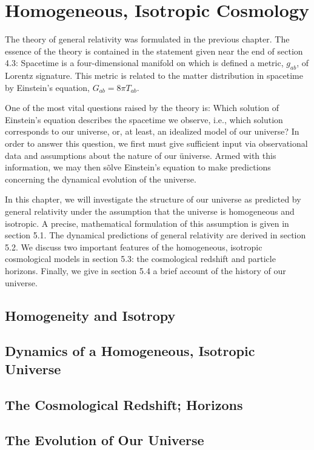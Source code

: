 \chapter{Homogeneous, Isotropic Cosmology}
The theory of general relativity was formulated in the previous chapter. The essence of the theory is contained in the statement given near the end of section 4.3: Spacetime is a four-dimensional manifold on which is defined a metric, $g_{ab}$, of Lorentz signature. This metric is related to the matter distribution in spacetime by Einstein's equation, $G_{ab}=8\pi T_{ab}.$

One of the most vital questions raised by the theory is: Which solution of Einstein's equation describes the spacetime we observe, i.e., which solution corresponds to our universe, or, at least, an idealized model of our universe? In order to answer this question, we first must give sufficient input via observational data and assumptions about the nature of our üniverse. Armed with this information, we may then sõlve Einstein's equation to make predictions concerning the dynamical evolution of the universe.

In this chapter, we will investigate the structure of our universe as predicted by general relativity under the assumption that the universe is homogeneous and isotropic. A precise, mathematical formulation of this assumption is given in section 5.1. The dynamical predictions of general relativity are derived in section 5.2. We discuss two important features of the homogeneous, isotropic cosmological models in section 5.3: the cosmological redshift and particle horizons. Finally, we give in section 5.4 a brief account of the history of our universe.


\section{Homogeneity and Isotropy}
\section{Dynamics of a Homogeneous, Isotropic Universe}
\section{The Cosmological Redshift; Horizons}
\section{The Evolution of Our Universe}

% 